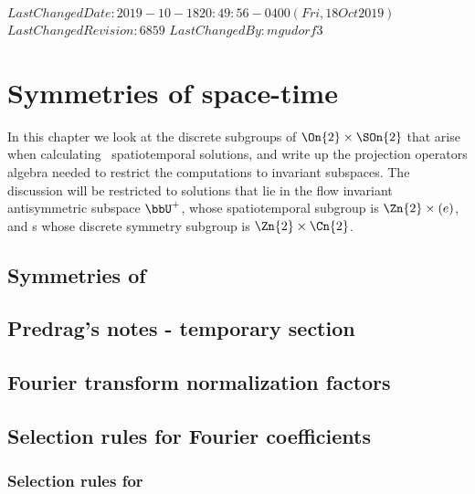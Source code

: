 {$LastChangedDate: 2019-10-18 20:49:56 -0400 (Fri, 18 Oct 2019) $}
{$LastChangedRevision: 6859 $} {$LastChangedBy: mgudorf3 $}

\chapter{Symmetries of space-time \KSe}
\label{chap:disc_symm}

In this chapter we look at the discrete subgroups of $\On{2} \times
\SOn{2}$ that arise when calculating \twot\ spatiotemporal solutions, and
write up the projection operators algebra needed to restrict the
computations to invariant subspaces. The discussion will be restricted to
solutions that lie in the flow invariant antisymmetric subspace $\bbU^+$,
whose spatiotemporal subgroup is $\Zn{2}\times (e)$, and \ppo s whose
discrete symmetry subgroup is $\Zn{2} \times \Cn{2}$.

\section{Symmetries of \KSe}
\label{sect:KSsymm}


\section*{Predrag's notes - temporary section}
\label{sect:KSsymmPC}


\section{Fourier transform normalization factors}
\label{sect:FTnormal}


\section{Selection rules for Fourier coefficients}
\label{sect:selection}

\subsection{Selection rules for \KS}
\label{sect:selectionKS}


